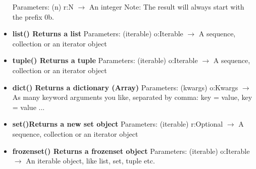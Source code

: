 \documentclass{report}
\begin{document}
\begin{itemize}
          \smallbreak \noindent
          Parameters: (n)
          \smallbreak \noindent
          r:N $\rightarrow$ An integer
          \smallbreak \noindent
          Note: The result will always start with the prefix 0b.
          \smallbreak \noindent
        \item[\ding{43}] \textbf{list()	Returns a list}
          \smallbreak \noindent
          Parameters: (iterable)
          \smallbreak \noindent
          o:Iterable $\rightarrow$ A sequence, collection or an iterator object
          \smallbreak \noindent
        \item[\ding{43}] \textbf{tuple()	Returns a tuple}
          \smallbreak \noindent
          Parameters: (iterable)
          \smallbreak \noindent
          o:Iterable $\rightarrow$ A sequence, collection or an iterator object
          \smallbreak \noindent
        \item[\ding{43}] \textbf{dict()	Returns a dictionary (Array)}
          \smallbreak \noindent
          Parameters: (kwargs)
          \smallbreak \noindent
          o:Kwargs $\rightarrow$ As many keyword arguments you like, separated by comma: key = value, key = value ...
          \smallbreak \noindent
        \item[\ding{43}] \textbf{set()Returns a new set object}
          \smallbreak \noindent
          Parameters: (iterable)
          \smallbreak \noindent
          r:Optional $\rightarrow$ A sequence, collection or an iterator object
          \smallbreak \noindent
        \item[\ding{43}] \textbf{frozenset() Returns a frozenset object}
          \smallbreak \noindent
          Parameters: (iterable)
          \smallbreak \noindent
          o:Iterable $\rightarrow$ An iterable object, like list, set, tuple etc.
          \smallbreak \noindent
      \end{itemize}
    

    \bigbreak \noindent 
    
\end{document}
